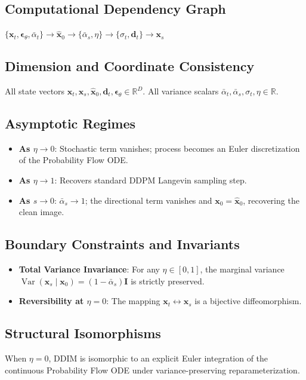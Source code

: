 \documentclass[11pt,a4paper]{article}
\theoremstyle{definition}
\begin{document}
\subsection{Computational Dependency Graph}
{\centering
$\{\mathbf{x}_t, \boldsymbol{\epsilon}_\theta, \bar{\alpha}_t\} \longrightarrow \hat{\mathbf{x}}_0 \longrightarrow \{\bar{\alpha}_s, \eta\} \longrightarrow \{\sigma_t, \mathbf{d}_t\} \longrightarrow \mathbf{x}_s$
\par}

\subsection{Dimension and Coordinate Consistency}
All state vectors $\mathbf{x}_t, \mathbf{x}_s, \hat{\mathbf{x}}_0, \mathbf{d}_t, \boldsymbol{\epsilon}_\theta \in \mathbb{R}^D$. All variance scalars $\bar{\alpha}_t, \bar{\alpha}_s, \sigma_t, \eta \in \mathbb{R}$.

\subsection{Asymptotic Regimes}
\begin{itemize}
    \item \textbf{As $\eta \to 0$}: Stochastic term vanishes; process becomes an Euler discretization of the Probability Flow ODE.
    \item \textbf{As $\eta \to 1$}: Recovers standard DDPM Langevin sampling step.
    \item \textbf{As $s \to 0$}: $\bar{\alpha}_s \to 1$; the directional term vanishes and $\mathbf{x}_0 = \hat{\mathbf{x}}_0$, recovering the clean image.
\end{itemize}

\subsection{Boundary Constraints and Invariants}
\begin{itemize}
    \item \textbf{Total Variance Invariance}: For any $\eta \in [0, 1]$, the marginal variance $\operatorname{Var}(\mathbf{x}_s \mid \mathbf{x}_0) = (1 - \bar{\alpha}_s)\mathbf{I}$ is strictly preserved.
    \item \textbf{Reversibility at $\eta = 0$}: The mapping $\mathbf{x}_t \leftrightarrow \mathbf{x}_s$ is a bijective diffeomorphism.
\end{itemize}

\subsection{Structural Isomorphisms}
When $\eta = 0$, DDIM is isomorphic to an explicit Euler integration of the continuous Probability Flow ODE under variance-preserving reparameterization.
\end{document}

